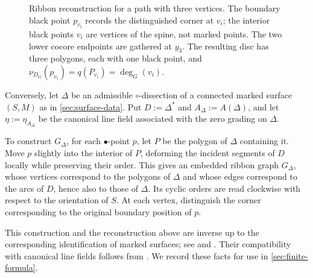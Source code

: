 \documentclass[11pt]{amsart}
\theoremstyle{definition}
\theoremstyle{plain}
\theoremstyle{definition}
\theoremstyle{definition}
\begin{document}
\begin{figure}[htbp]
\caption{Ribbon reconstruction for a path with three vertices.
The boundary black point $p_{v_i}$ records the distinguished corner at $v_i$;
the interior black points $v_i$ are vertices of the spine, not marked points.
The two lower cocore endpoints are gathered at $y_3$.  The resulting disc
has three polygons, each with one black point, and
$\nu_{D_G}(p_{v_i})=q(P_{v_i})=\deg_G(v_i)$.}
\label{fig:ribbon-reconstruction}
\end{figure}
\smallskip
Conversely, let $\Delta$ be an admissible $\circ$-dissection of
a connected marked surface $(S,M)$ as in \cref{sec:surface-data}.
Put $D:=\Delta^*$ and $A_\Delta:=A(\Delta)$, and let
$\eta:=\eta_{A_\Delta}$ be the canonical line field associated
with the zero grading on $\Delta$.

To construct $G_\Delta$, for each $\bullet$-point $p$, let $P$ be the polygon of
$\Delta$ containing it. Move $p$ slightly into the interior
of $P$, deforming the incident segments of $D$ locally
while preserving their order. This gives an embedded ribbon
graph $G_\Delta$, whose vertices correspond to the polygons
of $\Delta$ and whose edges correspond to the arcs of $D$,
hence also to those of $\Delta$. Its cyclic orders are read
clockwise with respect to the orientation of $S$. At each
vertex, distinguish the corner corresponding to the original
boundary position of $p$.

This construction and the reconstruction above are inverse
up to the corresponding identification of marked surfaces;
see \cite[Propositions~1.16 and~1.25]{OpperPlamondonSchroll}
and \cite[Proposition~3.13]{AmiotPlamondonSchroll}.
Their compatibility with canonical line fields follows from
\cite[Section~3.3]{AmiotPlamondonSchroll}.
We record these facts for use in \cref{sec:finite-formula}.
\end{document}
